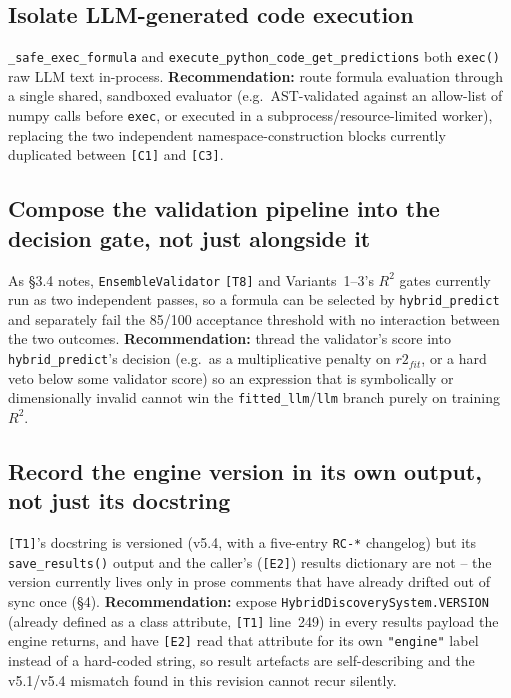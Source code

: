 \documentclass[11pt,a4paper]{article}
\newcommand{\code}[1]{\texttt{\small #1}}
\begin{document}
\subsection{Isolate LLM-generated code execution}
\code{\_safe\_exec\_formula} and
\code{execute\_python\_code\_get\_predictions} both \code{exec()} raw LLM
text in-process. \textbf{Recommendation:} route formula evaluation through
a single shared, sandboxed evaluator (e.g.\ AST-validated against an
allow-list of numpy calls before \code{exec}, or executed in a
subprocess/resource-limited worker), replacing the two independent
namespace-construction blocks currently duplicated between \code{[C1]} and
\code{[C3]}.

\subsection{Compose the validation pipeline into the decision gate, not just alongside it}
As \S3.4 notes, \code{EnsembleValidator} \code{[T8]} and Variants~1--3's
$R^2$ gates currently run as two independent passes, so a formula can be
selected by \code{hybrid\_predict} and separately fail the 85/100
acceptance threshold with no interaction between the two outcomes.
\textbf{Recommendation:} thread the validator's score into
\code{hybrid\_predict}'s decision (e.g.\ as a multiplicative penalty on
$r2_{fit}$, or a hard veto below some validator score) so an expression
that is symbolically or dimensionally invalid cannot win the
\texttt{fitted\_llm}/\texttt{llm} branch purely on training $R^2$.

\subsection{Record the engine version in its own output, not just its docstring}
\code{[T1]}'s docstring is versioned (v5.4, with a five-entry \code{RC-*}
changelog) but its \code{save\_results()} output and the caller's
(\code{[E2]}) results dictionary are not -- the version currently lives
only in prose comments that have already drifted out of sync once (\S4).
\textbf{Recommendation:} expose \code{HybridDiscoverySystem.VERSION}
(already defined as a class attribute, \code{[T1]} line~249) in every
results payload the engine returns, and have \code{[E2]} read that
attribute for its own \code{"engine"} label instead of a hard-coded
string, so result artefacts are self-describing and the v5.1/v5.4
mismatch found in this revision cannot recur silently.
\end{document}

